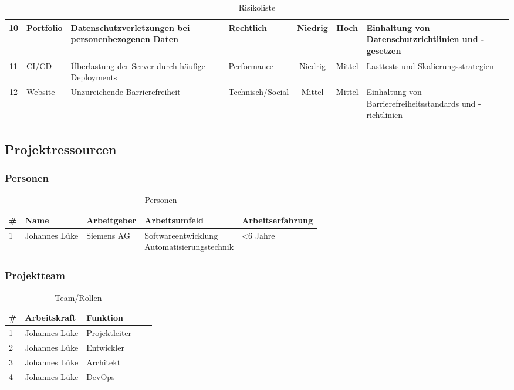 \begin{landscape}
\begin{table}[h!]
\begin{tabular}{|c|l|p{6cm}|l|c|c|p{6cm}|}
    10 & Portfolio   & Datenschutzverletzungen bei personenbezogenen Daten   & Rechtlich          & Niedrig            & Hoch     & Einhaltung von Datenschutzrichtlinien und -gesetzen         \\ \hline
    11 & CI/CD       & Überlastung der Server durch häufige Deployments      & Performance        & Niedrig            & Mittel   & Lasttests und Skalierungsstrategien                         \\ \hline
    12 & Website     & Unzureichende Barrierefreiheit                        & Technisch/Social   & Mittel             & Mittel   & Einhaltung von Barrierefreiheitsstandards und -richtlinien  \\ \hline
    \end{tabular}
    \caption{Risikoliste}
    \label{table:risikoliste}
    \end{table}
\end{landscape}
    

\subsection{ Projektressourcen }
\subsubsection{ Personen }

\begin{table}[H]
    \begin{tabular}{|l|l|l|l|l|}
        \hline
        \# & \textbf{Name}   & \textbf{Arbeitgeber} & \textbf{Arbeitsumfeld}           & \textbf{Arbeitserfahrung}        \\ \hline
        1  &  Johannes Lüke  &     Siemens AG       &    \makecell{ Softwareentwicklung\\Automatisierungstechnik  }   & <6 Jahre\\ \hline
    \end{tabular}
    \caption{Personen}
    \label{tab:Personen}
\end{table}

\subsubsection{ Projektteam }

\begin{table}[H]
    \begin{tabular}{|l|l|l|l|l|}
    \hline
    \# & \textbf{Arbeitskraft}   & \textbf{Funktion}    \\ \hline
    1  &  Johannes Lüke          &  Projektleiter       \\ \hline
    2  &  Johannes Lüke          &  Entwickler       \\ \hline
    3  &  Johannes Lüke          &  Architekt       \\ \hline
    4  &  Johannes Lüke          &  DevOps       \\ \hline 
    \end{tabular}
    \caption{Team/Rollen}
    \label{tab:TeamRollen}
\end{table}

